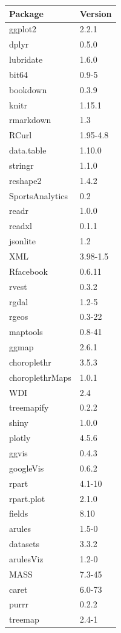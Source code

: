 \documentclass[]{book}
\theoremstyle{definition}
\theoremstyle{definition}
\theoremstyle{remark}
\begin{document}
\begin{tabular}{l|l}
\hline
Package & Version\\
\hline
ggplot2 & 2.2.1\\
\hline
dplyr & 0.5.0\\
\hline
lubridate & 1.6.0\\
\hline
bit64 & 0.9-5\\
\hline
bookdown & 0.3.9\\
\hline
knitr & 1.15.1\\
\hline
rmarkdown & 1.3\\
\hline
RCurl & 1.95-4.8\\
\hline
data.table & 1.10.0\\
\hline
stringr & 1.1.0\\
\hline
reshape2 & 1.4.2\\
\hline
SportsAnalytics & 0.2\\
\hline
readr & 1.0.0\\
\hline
readxl & 0.1.1\\
\hline
jsonlite & 1.2\\
\hline
XML & 3.98-1.5\\
\hline
Rfacebook & 0.6.11\\
\hline
rvest & 0.3.2\\
\hline
rgdal & 1.2-5\\
\hline
rgeos & 0.3-22\\
\hline
maptools & 0.8-41\\
\hline
ggmap & 2.6.1\\
\hline
choroplethr & 3.5.3\\
\hline
choroplethrMaps & 1.0.1\\
\hline
WDI & 2.4\\
\hline
treemapify & 0.2.2\\
\hline
shiny & 1.0.0\\
\hline
plotly & 4.5.6\\
\hline
ggvis & 0.4.3\\
\hline
googleVis & 0.6.2\\
\hline
rpart & 4.1-10\\
\hline
rpart.plot & 2.1.0\\
\hline
fields & 8.10\\
\hline
arules & 1.5-0\\
\hline
datasets & 3.3.2\\
\hline
arulesViz & 1.2-0\\
\hline
MASS & 7.3-45\\
\hline
caret & 6.0-73\\
\hline
purrr & 0.2.2\\
\hline
treemap & 2.4-1\\
\hline
\end{tabular}
\end{document}
